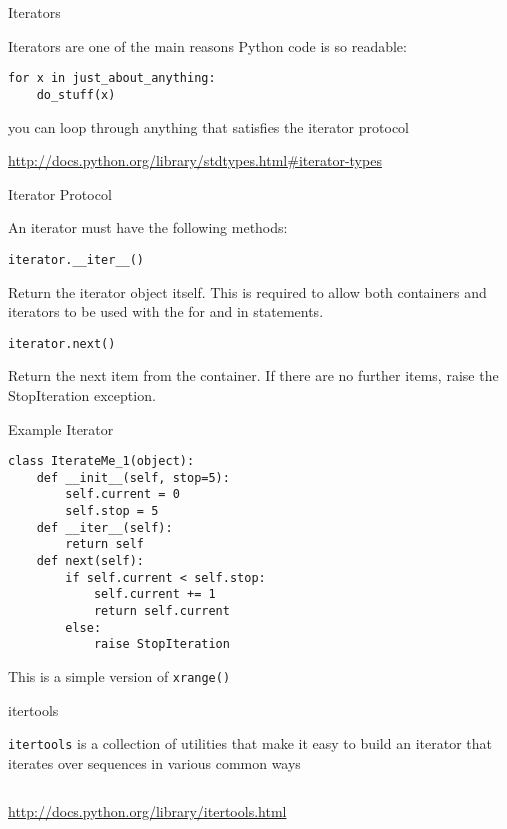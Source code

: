 \documentclass{beamer}
\begin{document}
\begin{frame}[fragile]{Iterators}

{\Large Iterators are one of the main reasons Python code is so readable:}

\begin{verbatim}
for x in just_about_anything:
    do_stuff(x)
\end{verbatim}

{\Large you can loop through anything that satisfies the iterator protocol}

\vfill
\url{http://docs.python.org/library/stdtypes.html#iterator-types}
\end{frame} 

\begin{frame}[fragile]{Iterator Protocol}

{\Large An iterator must have the following methods:}

\begin{verbatim}
iterator.__iter__()
\end{verbatim}

Return the iterator object itself. This is required to allow both containers
and iterators to be used with the for and in statements.

\begin{verbatim}
iterator.next()
\end{verbatim}

Return the next item from the container. If there are no further items,
raise the StopIteration exception.

\end{frame} 


\begin{frame}[fragile]{Example Iterator}

\begin{verbatim}
class IterateMe_1(object):
    def __init__(self, stop=5):
        self.current = 0
        self.stop = 5
    def __iter__(self):
        return self
    def next(self):
        if self.current < self.stop:
            self.current += 1
            return self.current
        else:
            raise StopIteration
\end{verbatim}

{\Large This is a simple version of \verb|xrange()|}

\end{frame} 

\begin{frame}[fragile]{itertools}

{\Large \verb|itertools| is a collection of utilities that make it easy to
build an iterator that iterates over sequences in various common ways}

\begin{verbatim}

\end{verbatim}

\url{http://docs.python.org/library/itertools.html}

\end{frame}
\end{document}
